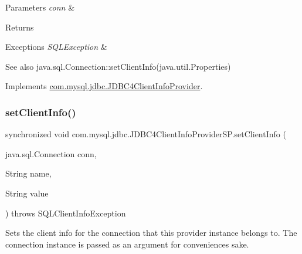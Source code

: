 \begin{DoxyParams}{Parameters}
{\em conn} & \\
\hline
\end{DoxyParams}
\begin{DoxyReturn}{Returns}

\end{DoxyReturn}

\begin{DoxyExceptions}{Exceptions}
{\em S\+Q\+L\+Exception} & \\
\hline
\end{DoxyExceptions}
\begin{DoxySeeAlso}{See also}
java.\+sql.\+Connection\+::set\+Client\+Info(java.\+util.\+Properties) 
\end{DoxySeeAlso}


Implements \mbox{\hyperlink{interfacecom_1_1mysql_1_1jdbc_1_1_j_d_b_c4_client_info_provider_ac2ed3391acf830bcb04941654e2cefe3}{com.\+mysql.\+jdbc.\+J\+D\+B\+C4\+Client\+Info\+Provider}}.

\mbox{\label{classcom_1_1mysql_1_1jdbc_1_1_j_d_b_c4_client_info_provider_s_p_afc850b09b440756a3a5ecc69b8745ce4}} 
\subsubsection{\texorpdfstring{set\+Client\+Info()}{setClientInfo()}\hspace{0.1cm}{\footnotesize\ttfamily [2/2]}}
{\footnotesize\ttfamily synchronized void com.\+mysql.\+jdbc.\+J\+D\+B\+C4\+Client\+Info\+Provider\+S\+P.\+set\+Client\+Info (\begin{DoxyParamCaption}\item[{java.\+sql.\+Connection}]{conn,  }\item[{String}]{name,  }\item[{String}]{value }\end{DoxyParamCaption}) throws S\+Q\+L\+Client\+Info\+Exception}

Sets the client info for the connection that this provider instance belongs to. The connection instance is passed as an argument for convenience\textquotesingle{}s sake.

